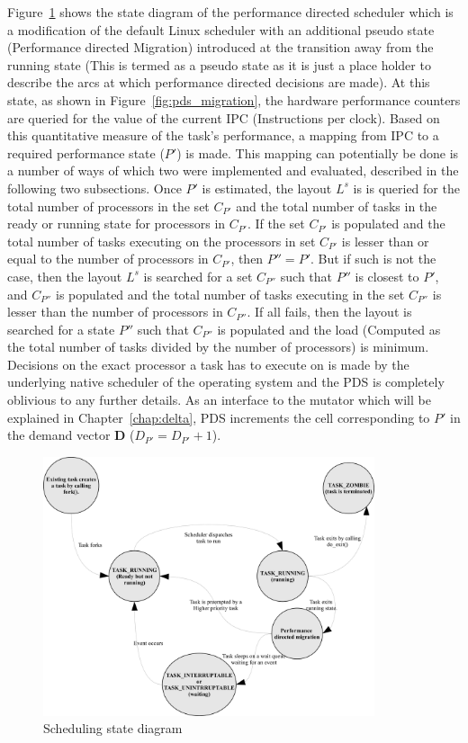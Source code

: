 Figure~\ref{fig:pds_method} shows the state diagram of the performance directed scheduler which is a modification of
the default Linux scheduler with an additional pseudo state (Performance directed Migration) introduced at the transition 
away from the running state (This is termed as a pseudo state as it is just a place holder to describe the arcs at 
which performance directed decisions are made). At this state, as shown in Figure~\ref{fig:pds_migration}, the hardware 
performance counters are queried for the value of the current IPC (Instructions per clock). 
Based on this quantitative measure of the task's performance,
a mapping from IPC to a required performance state ($P'$) is made. This mapping can potentially be done is a number of ways 
of which two were implemented and evaluated, described in the following two subsections. Once $P'$ is estimated, 
the layout $L^s$ is is queried for the total number of processors in the set $C_{P'}$ and the total number of tasks in the 
ready or running state for processors in $C_{P'}$. If the set $C_{P'}$ is populated and the total number of tasks executing 
on the processors in set $C_{P'}$ is lesser than or equal
to the number of processors in $C_{P'}$, then $P'' = P'$. But if such is not the case, then the layout $L^s$ is searched
for a set $C_{P''}$ such that $P''$ is closest to $P'$, and $C_{P''}$ is populated and the total number of tasks 
executing in the set $C_{P''}$ is lesser than the number of processors in $C_{P''}$. If all fails, then the layout
is searched for a state $P''$ such that $C_{P''}$ is populated and the load (Computed as the total number of tasks 
divided by the number of processors) is minimum. Decisions on the exact processor a task has to execute on is made by the 
underlying native scheduler of the operating system and the PDS is completely oblivious to any further details.
As an interface to the mutator which will be explained in Chapter~\ref{chap:delta}, PDS
increments the cell corresponding to $P'$ in the demand vector \textbf{D} ($D_{P'} = D_{P'} + 1$).

\begin{figure}[h!]
  \begin{center}
    \includegraphics[height=3in]{figures/Mod_Linux_Sched.jpg}
    \caption{Scheduling state diagram}
    \label{fig:pds_method}
  \end{center}
\end{figure}

